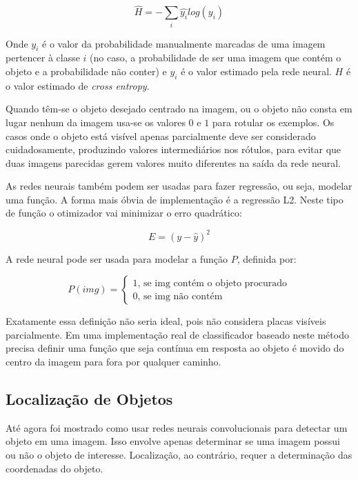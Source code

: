 \begin{equation}
	\widehat{H} = - \sum_i \widehat{y_i} log(y_i)
\end{equation}

Onde $y_i$ é o valor da probabilidade manualmente
marcadas de uma imagem pertencer à classe $i$ (no caso, a probabilidade de ser
uma imagem que contém o objeto e a probabilidade não conter) e $\widehat{y_i}$
é o valor estimado pela rede neural. $H$ é o valor estimado de
\emph{cross entropy}.

Quando têm-se o objeto desejado centrado na imagem, ou o objeto não consta
em lugar nenhum da imagem usa-se os valores $0$ e $1$ para rotular os exemplos.
Os casos onde o objeto está visível apenas parcialmente deve ser considerado
cuidadosamente, produzindo valores intermediários nos rótulos, para evitar que
duas imagens parecidas gerem valores muito diferentes na saída da rede neural.

As redes neurais também podem ser usadas para fazer regressão, ou seja, modelar
uma função. A forma mais óbvia de implementação é a regressão L2. Neste tipo de
função o otimizador vai minimizar o erro quadrático:

\begin{equation}
	E=\left( y - \widehat{y} \right)^2
\end{equation}

A rede neural pode ser usada para modelar a função $P$, definida por:

\begin{equation}
	P(img) = \begin{cases}
		1 \text{, se img contém o objeto procurado} \\
		0 \text{, se img não contém}
	\end{cases}
\end{equation}

Exatamente essa definição não seria ideal, pois não considera placas visíveis
parcialmente. Em uma implementação real de classificador baseado neste método
precisa definir uma função que seja contínua em resposta ao objeto é movido do
centro da imagem para fora por qualquer caminho.

\subsection{Localização de Objetos} \label{sec:localiz_objetos}
Até agora foi mostrado como usar redes neurais convolucionais para detectar um
objeto em uma imagem. Isso envolve apenas determinar se uma imagem possui ou não
o objeto de interesse. Localização, ao contrário, requer a determinação das
coordenadas do objeto.

